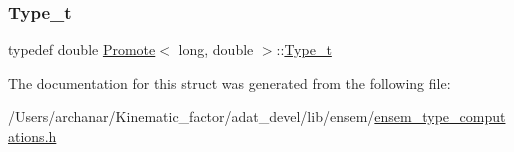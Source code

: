 \subsubsection{\texorpdfstring{Type\_t}{Type\_t}\hspace{0.1cm}{\footnotesize\ttfamily [2/2]}}
{\footnotesize\ttfamily typedef double \mbox{\hyperlink{structPromote}{Promote}}$<$ long, double $>$\+::\mbox{\hyperlink{structPromote_3_01long_00_01double_01_4_aab2bb863f5db06bd92f7818e53d06867}{Type\+\_\+t}}}



The documentation for this struct was generated from the following file\+:\begin{DoxyCompactItemize}
\item 
/\+Users/archanar/\+Kinematic\+\_\+factor/adat\+\_\+devel/lib/ensem/\mbox{\hyperlink{lib_2ensem_2ensem__type__computations_8h}{ensem\+\_\+type\+\_\+computations.\+h}}\end{DoxyCompactItemize}
